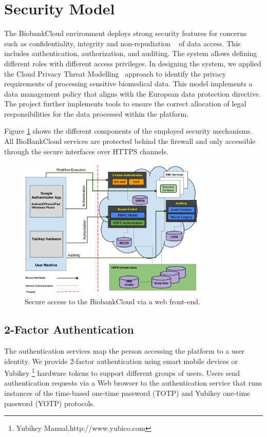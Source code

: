 \section{Security Model}

The BiobankCloud environment deploys strong security features for concerns such as confidentiality, integrity and non-repudiation ~\cite{BBCSEC} of data access. This includes authentication, authorization, and auditing. The system allows defining different roles with different access privileges. In designing the system, we applied the Cloud Privacy Threat Modelling~\cite {CPTM} approach to identify the privacy requirements of processing sensitive biomedical data. This model implements a data management policy that aligns with the European data protection directive. The project further implements tools to ensure the correct allocation of legal responsibilities for the data processed within the platform. 


Figure \ref{fig:security} shows the different components of the employed security mechanisms. All BioBankCloud services are protected behind the firewall and only accessible through the secure interfaces over HTTPS channels.
\vskip-5pt
\begin{figure}[h]
\centering
\includegraphics[width=0.8\textwidth]{./imgs/security.png}
\caption{Secure access to the BiobankCloud via a web front-end.}
\label{fig:security}
\end{figure}
\vskip-5pt
\subsection{2-Factor Authentication}
The authentication services map the person accessing the platform to a user identity. We provide 2-factor authentication using smart mobile devices or Yubikey \footnote {Yubikey Manual,http://www.yubico.com} hardware tokens to support different groups of users. Users send authentication requests via a Web browser to the authentication service that runs instances of the time-based one-time password (TOTP) and Yubikey one-time password (YOTP) protocols.

